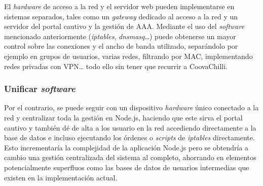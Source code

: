 El \emph{hardware} de acceso a la red y el servidor web pueden implementarse en sistemas separados, tales como un \emph{gateway} dedicado al acceso a la red y un servidor del portal cautivo y la gestión de AAA. Mediante el uso del \emph{software} mencionado anteriormente (\emph{iptables}, \emph{dnsmasq}…) puede obtenerse un mayor control sobre las conexiones y el ancho de banda utilizado, separándolo por ejemplo en grupos de usuarios, varias redes, filtrando por MAC, implementando redes privadas con VPN… todo ello sin tener que recurrir a CoovaChilli.

\subsubsection{Unificar \emph{software}}
Por el contrario, se puede seguir con un dispositivo \emph{hardware} único conectado a la red y centralizar toda la gestión en Node.js, haciendo que este sirva el portal cautivo y también dé de alta a los usuario en la red accediendo directamente a la base de datos e incluso ejecutando los órdenes o \emph{scripts} de \emph{iptables} directamente. Esto incrementaría la complejidad de la aplicación Node.js pero se obtendría a cambio una gestión centralizada del sistema al completo, ahorrando en elementos potencialmente superfluos como las bases de datos de usuarios intermedias que existen en la implementación actual.


